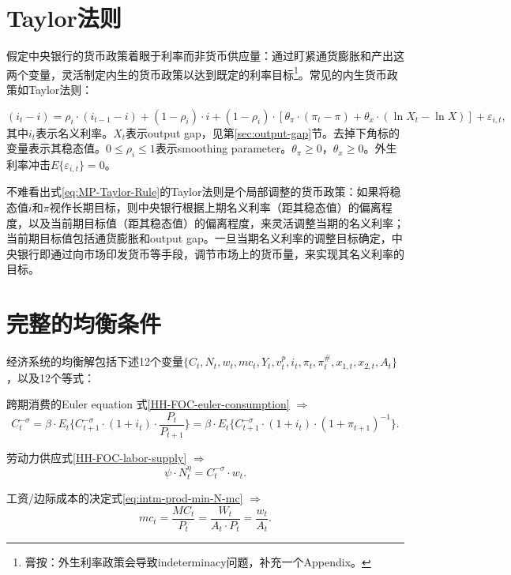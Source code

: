 \section{Taylor法则}
\label{seq:Taylor-Rule}
假定中央银行的货币政策着眼于利率而非货币供应量：通过盯紧通货膨胀和产出这两个变量，灵活制定内生的货币政策以达到既定的利率目标\footnote{膏按：外生利率政策会导致indeterminacy问题，补充一个Appendix。}。常见的内生货币政策如Taylor法则：

\begin{equation}
  \label{eq:MP-Taylor-Rule}
  (i_t-i) = \rho_i \cdot (i_{t-1}-i) + (1-\rho_i) \cdot i+ (1-\rho_i) \cdot \left[
    \theta_{\pi} \cdot (\pi_t - \pi) + \theta_{x} \cdot (\ln X_t - \ln X)
  \right] + \varepsilon_{i,t},
\end{equation}
其中$i_t$表示名义利率。$X_t$表示output gap，见第\ref{sec:output-gap}节。去掉下角标的变量表示其稳态值。$0 \le \rho_i \le 1$表示smoothing parameter。$\theta_\pi \ge 0$，$\theta_{x} \ge 0$。外生利率冲击$E\{ \varepsilon_{i,t}\} = 0$。

不难看出式\eqref{eq:MP-Taylor-Rule}的Taylor法则是个局部调整的货币政策：如果将稳态值$i$和$\pi$视作长期目标，则中央银行根据上期名义利率（距其稳态值）的偏离程度，以及当前期目标值（距其稳态值）的偏离程度，来灵活调整当期的名义利率；当前期目标值包括通货膨胀和output gap。一旦当期名义利率的调整目标确定，中央银行即通过向市场印发货币等手段，调节市场上的货币量，来实现其名义利率的目标。

\section{完整的均衡条件}
\label{sec:full-set-equilibrium-conditions}
经济系统的均衡解包括下述12个变量$\{ C_t, N_t, w_t, mc_t, Y_t, v^p_t, i_t, \pi_t, \pi^{\#}_t, x_{1,t}, x_{2,t}, A_t \}$，以及12个等式：

跨期消费的Euler equation 式\eqref{HH-FOC-euler-consumption} $\Rightarrow$
\begin{equation*}
    C_t^{-\sigma} = \beta \cdot E_t\{ C_{t+1}^{-\sigma} \cdot (1+i_t) \cdot \frac{P_t}{P_{t+1}}\}=\beta \cdot E_t\{ C_{t+1}^{-\sigma} \cdot (1+i_t) \cdot ( 1+\pi_{t+1} )^{-1}\}.
\end{equation*}

劳动力供应式\eqref{HH-FOC-labor-supply} $\Rightarrow$
\begin{equation*}
    \psi \cdot N_t^{\eta} = C_t^{-\sigma} \cdot w_t.
\end{equation*}

工资/边际成本的决定式\eqref{eq:intm-prod-min-N-mc} $\Rightarrow$
\begin{equation*}
    mc_t = \frac{MC_t}{P_t} = \frac{W_t}{A_t \cdot P_t} = \frac{w_t}{A_t}.
\end{equation*}

